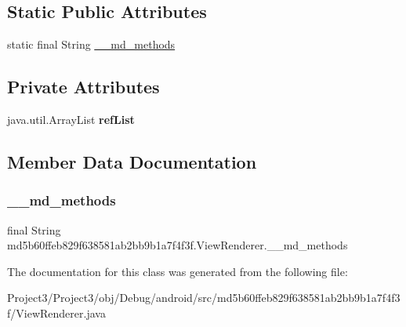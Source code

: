 \subsection*{Static Public Attributes}
\begin{DoxyCompactItemize}
\item 
static final String \hyperlink{classmd5b60ffeb829f638581ab2bb9b1a7f4f3f_1_1ViewRenderer_a9d61e0ff54f2c1a789912ef2d2e97d9d}{\+\_\+\+\_\+md\+\_\+methods}
\end{DoxyCompactItemize}
\subsection*{Private Attributes}
\begin{DoxyCompactItemize}
\item 
\mbox{\label{classmd5b60ffeb829f638581ab2bb9b1a7f4f3f_1_1ViewRenderer_a0833259dc6ac4a65396cf7f3fedd9f17}} 
java.\+util.\+Array\+List {\bfseries ref\+List}
\end{DoxyCompactItemize}


\subsection{Member Data Documentation}
\mbox{\label{classmd5b60ffeb829f638581ab2bb9b1a7f4f3f_1_1ViewRenderer_a9d61e0ff54f2c1a789912ef2d2e97d9d}} 
\subsubsection{\texorpdfstring{\+\_\+\+\_\+md\+\_\+methods}{\_\_md\_methods}}
{\footnotesize\ttfamily final String md5b60ffeb829f638581ab2bb9b1a7f4f3f.\+View\+Renderer.\+\_\+\+\_\+md\+\_\+methods\hspace{0.3cm}{\ttfamily [static]}}



The documentation for this class was generated from the following file\+:\begin{DoxyCompactItemize}
\item 
Project3/\+Project3/obj/\+Debug/android/src/md5b60ffeb829f638581ab2bb9b1a7f4f3f/View\+Renderer.\+java\end{DoxyCompactItemize}
